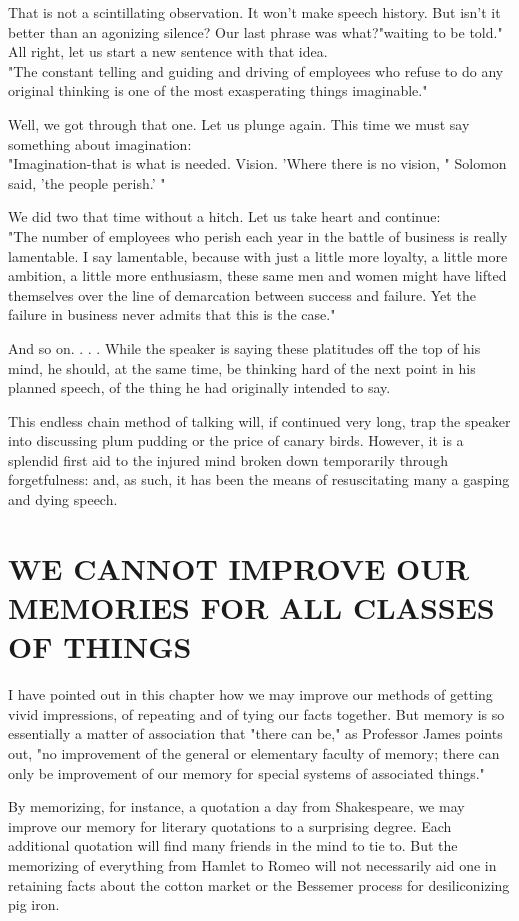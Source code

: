 \documentclass[10pt]{article}
\begin{document}
That is not a scintillating observation. It won't make speech history. But isn't it better than an agonizing silence? Our last phrase was what?"waiting to be told." All right, let us start a new sentence with that idea.\\
"The constant telling and guiding and driving of employees who refuse to do any original thinking is one of the most exasperating things imaginable."

Well, we got through that one. Let us plunge again. This time we must say something about imagination:\\
"Imagination-that is what is needed. Vision. 'Where there is no vision, " Solomon said, 'the people perish.' "

We did two that time without a hitch. Let us take heart and continue:\\
"The number of employees who perish each year in the battle of business is really lamentable. I say lamentable, because with just a little more loyalty, a little more ambition, a little more enthusiasm, these same men and women might have lifted themselves over the line of demarcation between success and failure. Yet the failure in business never admits that this is the case."

And so on. . . . While the speaker is saying these platitudes off the top of his mind, he should, at the same time, be thinking hard of the next point in his planned speech, of the thing he had originally intended to say.

This endless chain method of talking will, if continued very long, trap the speaker into discussing plum pudding or the price of canary birds. However, it is a splendid first aid to the injured mind broken down temporarily through forgetfulness: and, as such, it has been the means of resuscitating many a gasping and dying speech.

\section*{WE CANNOT IMPROVE OUR MEMORIES FOR ALL CLASSES OF THINGS}
I have pointed out in this chapter how we may improve our methods of getting vivid impressions, of repeating and of tying our facts together. But memory is so essentially a matter of association that "there can be," as Professor James points out, "no improvement of the general or elementary faculty of memory; there can only be improvement of our memory for special systems of associated things."

By memorizing, for instance, a quotation a day from Shakespeare, we may improve our memory for literary quotations to a surprising degree. Each additional quotation will find many friends in the mind to tie to. But the memorizing of everything from Hamlet to Romeo will not necessarily aid one in retaining facts about the cotton market or the Bessemer process for desiliconizing pig iron.
\end{document}
